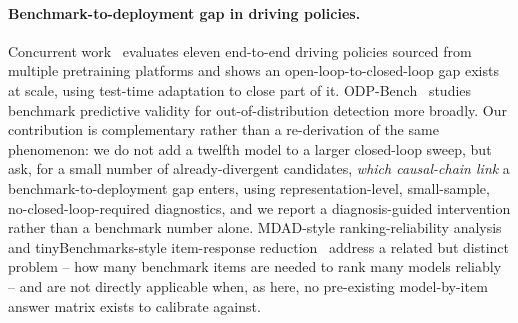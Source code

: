 \paragraph{Benchmark-to-deployment gap in driving policies.}
Concurrent work~\cite{bridgesim2026} evaluates eleven end-to-end driving policies sourced
from multiple pretraining platforms and shows an open-loop-to-closed-loop gap exists at
scale, using test-time adaptation to close part of it. ODP-Bench~\cite{odpbench2025}
studies benchmark predictive validity for out-of-distribution detection more broadly.
Our contribution is complementary rather than a re-derivation of the same phenomenon: we
do not add a twelfth model to a larger closed-loop sweep, but ask, for a small number of
already-divergent candidates, \emph{which causal-chain link} a benchmark-to-deployment
gap enters, using representation-level, small-sample, no-closed-loop-required
diagnostics, and we report a diagnosis-guided intervention rather than a benchmark
number alone. MDAD-style ranking-reliability analysis~\cite{mdad2025} and
tinyBenchmarks-style item-response reduction~\cite{tinybenchmarks} address a related but
distinct problem -- how many benchmark items are needed to rank many models reliably --
and are not directly applicable when, as here, no pre-existing model-by-item answer
matrix exists to calibrate against.
